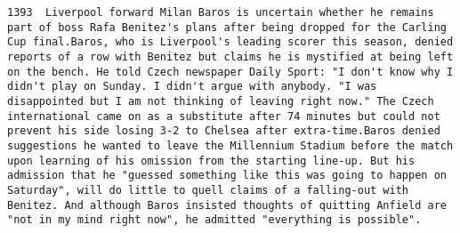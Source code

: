 \documentclass[11pt]{article}
\begin{document}
\begin{Verbatim}[commandchars=\\\{\}]
         1393  Liverpool forward Milan Baros is uncertain whether he remains part of boss Rafa Benitez's plans after being dropped for the Carling Cup final.Baros, who is Liverpool's leading scorer this season, denied reports of a row with Benitez but claims he is mystified at being left on the bench. He told Czech newspaper Daily Sport: "I don't know why I didn't play on Sunday. I didn't argue with anybody. "I was disappointed but I am not thinking of leaving right now." The Czech international came on as a substitute after 74 minutes but could not prevent his side losing 3-2 to Chelsea after extra-time.Baros denied suggestions he wanted to leave the Millennium Stadium before the match upon learning of his omission from the starting line-up. But his admission that he "guessed something like this was going to happen on Saturday", will do little to quell claims of a falling-out with Benitez. And although Baros insisted thoughts of quitting Anfield are "not in my mind right now", he admitted "everything is possible".                                                                                                                                                                                                                                                                                                                                                                                                                                                                                                                                                                                                                                                                                                                                                                                                                                                                                                                                                                                                                                                                                                                                                                                                                                                                                                                                                                                                                                                                                                                                                                                                                                                                                                                                                                                                                                                                                                                                                                                                                                                                                                                                                                                                                                                                                                                                                            
\end{Verbatim}
\end{document}
